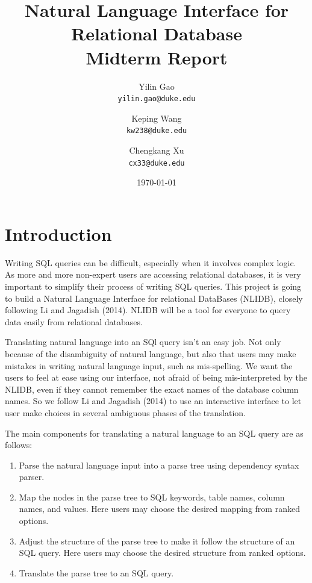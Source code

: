 \documentclass[twocolumn]{article}
\begin{document}
\title{Natural Language Interface for Relational Database\\
	\small{Midterm Report}}

\author{Yilin Gao \\
	\small \texttt{yilin.gao@duke.edu} \and 
	Keping Wang \\
	\small \texttt{kw238@duke.edu} \and 
	Chengkang Xu \\
	\small \texttt{cx33@duke.edu} }
	
\date{\today}
\maketitle

\section{Introduction}\label{sec:introduction}

Writing SQL queries can be difficult, especially when it involves complex logic. As more and more non-expert users are accessing relational databases, it is very important to simplify their process of writing SQL queries. This project is going to build a Natural Language Interface for relational DataBases (NLIDB), closely following Li and Jagadish (2014)\cite{li2014}. NLIDB will be a tool for everyone to query data easily from relational databases.

Translating natural language into an SQl query isn't an easy job. Not only because of the disambiguity of natural language, but also that users may make mistakes in writing natural language input, such as mis-spelling. We want the users to feel at ease using our interface, not afraid of being mis-interpreted by the NLIDB, even if they cannot remember the exact names of the database column names. So we follow Li and Jagadish (2014)\cite{li2014} to use an interactive interface to let user make choices in several ambiguous phases of the translation.

The main components for translating a natural language to an SQL query are as follows:

\begin{enumerate}
  \item Parse the natural language input into a parse tree using dependency syntax parser.
  \item Map the nodes in the parse tree to SQL keywords, table names, column names, and values. Here users may choose the desired mapping from ranked options.
  \item Adjust the structure of the parse tree to make it follow the structure of an SQL query. Here users may choose the desired structure from ranked options.
  \item Translate the parse tree to an SQL query.
\end{enumerate}
\end{document}
